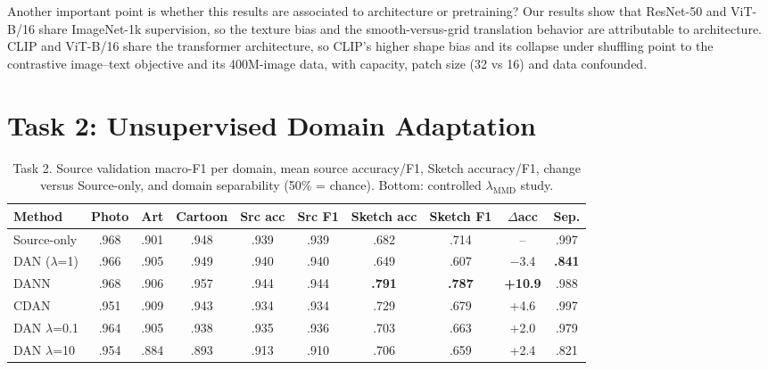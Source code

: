 \documentclass{article}
\begin{document}
Another important point is whether this results are associated to architecture or pretraining? Our results show that ResNet-50 and ViT-B/16 share ImageNet-1k supervision, so the texture bias and the smooth-versus-grid translation behavior are attributable to architecture. CLIP and ViT-B/16 share the transformer architecture, so CLIP's higher shape bias and its collapse under shuffling point to the contrastive image--text objective and its 400M-image data, with capacity, patch size (32 vs 16) and data confounded.



\section{Task 2: Unsupervised Domain Adaptation}
\begin{table}[t]
\centering\small
\caption{Task 2. Source validation macro-F1 per domain, mean source accuracy/F1, Sketch accuracy/F1, change versus
Source-only, and domain separability (50\% = chance). Bottom: controlled $\lambda_{\mathrm{MMD}}$ study.}
\label{tab:t2}
\setlength{\tabcolsep}{4pt}
\begin{tabular}{@{}lccccccccc@{}}
\toprule
Method & Photo & Art & Cartoon & Src acc & Src F1 & Sketch acc & Sketch F1 & $\Delta$acc & Sep. \\
\midrule
Source-only & .968 & .901 & .948 & .939 & .939 & .682 & .714 & -- & .997 \\
DAN ($\lambda$=1) & .966 & .905 & .949 & .940 & .940 & .649 & .607 & $-$3.4 & \textbf{.841} \\
DANN & .968 & .906 & .957 & .944 & .944 & \textbf{.791} & \textbf{.787} & \textbf{+10.9} & .988 \\
CDAN & .951 & .909 & .943 & .934 & .934 & .729 & .679 & +4.6 & .997 \\
\midrule
DAN $\lambda$=0.1 & .964 & .905 & .938 & .935 & .936 & .703 & .663 & +2.0 & .979 \\
DAN $\lambda$=10 & .954 & .884 & .893 & .913 & .910 & .706 & .659 & +2.4 & .821 \\
\bottomrule
\end{tabular}
\end{table}
\end{document}

